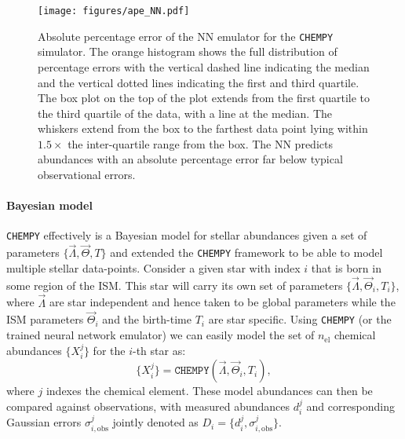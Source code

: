 \documentclass{aa}
\begin{document}
\begin{figure}[]
     \centering
     \texttt{[image: figures/ape\_NN.pdf]}
     \vspace{-.5cm}
     \caption{Absolute percentage error of the NN emulator for the \texttt{CHEMPY} simulator. The orange histogram shows the full distribution of percentage errors with the vertical dashed line indicating the median and the vertical dotted lines indicating the first and third quartile. The box plot on the top of the plot extends from the first quartile to the third quartile of the data, with a line at the median. The whiskers extend from the box to the farthest data point lying within $1.5\times$ the inter-quartile range from the box. The NN predicts abundances with an absolute percentage error far below typical observational errors.}
     \label{fig:ape_NN}
\end{figure}



\paragraph{Bayesian model}
\texttt{CHEMPY} effectively is a Bayesian model for stellar abundances given a set of parameters $\{\Vec{\Lambda},\Vec{\Theta},T\}$ and \citet{Philcox_2019} extended the \texttt{CHEMPY} framework to be able to model multiple stellar data-points. Consider a given star with index $i$ that is born in some region of the ISM. This star will carry its own set of parameters $\{\Vec{\Lambda},\Vec{\Theta}_i,T_i\}$, where $\Vec{\Lambda}$ are star independent and hence taken to be global parameters while the ISM parameters $\Vec{\Theta}_i$ and the birth-time $T_i$ are star specific. Using \texttt{CHEMPY} (or the trained neural network emulator) we can easily model the set of $n_\mathrm{el}$ chemical abundances $\{X_i^j\}$ for the $i$-th star as: 
\begin{equation}\label{eq:chempy_function}
\{X_i^j\} = \texttt{CHEMPY}(\Vec{\Lambda},\Vec{\Theta}_i,T_i),
\end{equation}
where $j$ indexes the chemical element. 
These model abundances can then be compared against observations, with measured abundances $d_i^j$ and corresponding Gaussian errors $\sigma_{i,\mathrm{obs}}^j$ jointly denoted as $D_i=\{d_i^j,\sigma_{i,\mathrm{obs}}^j\}$.
\end{document}
